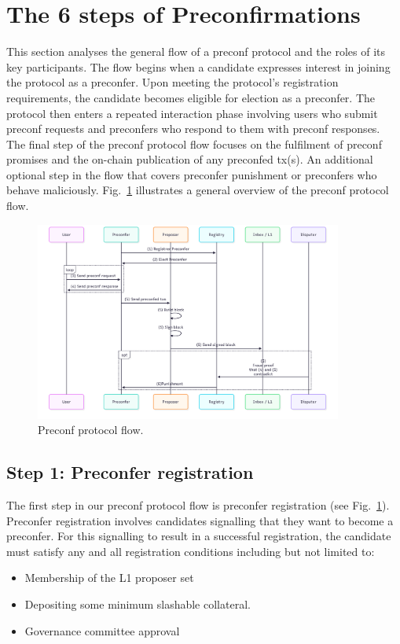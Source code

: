 \documentclass[a4paper]{article}
\theoremstyle{boldstyle}
\begin{document}
\section{The 6 steps of Preconfirmations}
This section analyses the general flow of a preconf protocol and the roles of its key participants. The flow begins when a candidate expresses interest in joining the protocol as a preconfer. Upon meeting the protocol’s registration requirements, the candidate becomes eligible for election as a preconfer. The protocol then enters a repeated interaction phase involving users who submit preconf requests and preconfers who respond to them with preconf responses. The final step of the preconf protocol flow focuses on the fulfilment of preconf promises and the on-chain publication of any preconfed tx(s). An additional optional step in the flow that covers preconfer punishment or preconfers who behave maliciously. Fig.~\ref{preconf_protocol_flow} illustrates a general overview of the preconf protocol flow.


    \begin{figure}[htbp]
        \centering
        \includegraphics[width=0.9\textwidth]{figures/preconfProtocolFlow.png}
        \caption{Preconf protocol flow.}
        \label{preconf_protocol_flow}
    \end{figure}
    
\subsection{Step 1: Preconfer registration}
\label{step1:preconfer_registration}
    The first step in our preconf protocol flow is preconfer registration (see Fig.~\ref{preconf_protocol_flow}). Preconfer registration involves candidates signalling that they want to become a preconfer. For this signalling to result in a successful registration, the candidate must satisfy any and all registration conditions including but not limited to:
    \begin{itemize}
        \item Membership of the L1 proposer set
        \item Depositing some minimum slashable collateral.
        \item Governance committee approval
    \end{itemize}
\end{document}
